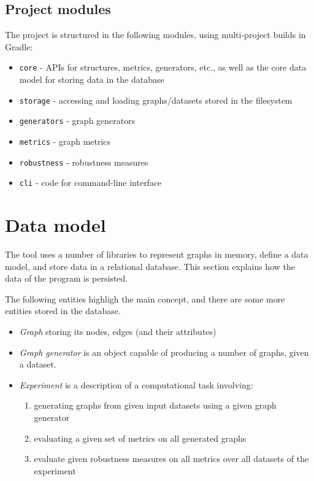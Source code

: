 \subsection{Project modules}

The project is structured in the following modules, using multi-project builds in Gradle:
\begin{itemize}
    \item \texttt{core} - APIs for structures, metrics, generators, etc., as well as the core data model for storing data in the database
    \item \texttt{storage} - accessing and loading graphs/datasets stored in the filesystem
    \item \texttt{generators} - graph generators
    \item \texttt{metrics} - graph metrics
    \item \texttt{robustness} - robustness measures
    \item \texttt{cli} - code for command-line interface
\end{itemize}



\section{Data model}

The \graffs tool uses a number of libraries to represent graphs in memory, define a data model, and store data in a relational database.
This section explains how the data of the program is persisted.

The following entities highligh the main concept, and there are some more entities stored in the database.
\begin{itemize}[topsep=5pt]
    \item \textsl{Graph} storing its nodes, edges (and their attributes)
    \item \textsl{Graph generator} is an object capable of producing a number of graphs, given a dataset.
    \item \textsl{Experiment} is a description of a computational task involving:
    \begin{enumerate}[topsep=5pt]
        \item generating graphs from given input datasets using a given graph generator
        \item evaluating a given set of metrics on all generated graphs
        \item evaluate given robustness measures on all metrics over all datasets of the experiment
    \end{enumerate}
\end{itemize}

